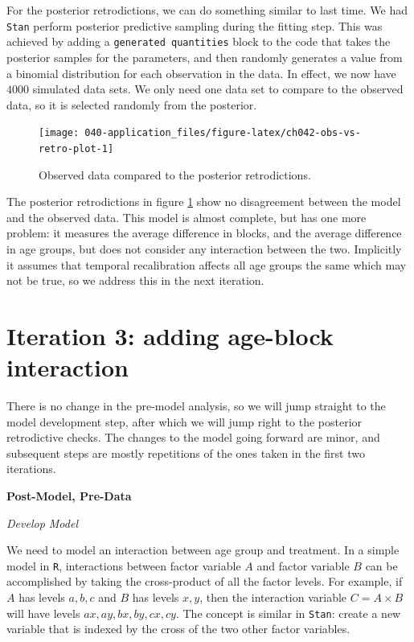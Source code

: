 \documentclass[11pt, oneside, openany]{scrbook}
\begin{document}
For the posterior retrodictions, we can do something similar to last time. We had \texttt{Stan} perform posterior predictive sampling during the fitting step. This was achieved by adding a \texttt{generated\ quantities} block to the code that takes the posterior samples for the parameters, and then randomly generates a value from a binomial distribution for each observation in the data. In effect, we now have \(4000\) simulated data sets. We only need one data set to compare to the observed data, so it is selected randomly from the posterior.

\begin{figure}

{\centering \texttt{[image: 040-application\_files/figure-latex/ch042-obs-vs-retro-plot-1]} 

}

\caption{Observed data compared to the posterior retrodictions.}\label{fig:ch042-obs-vs-retro-plot}
\end{figure}

The posterior retrodictions in figure \ref{fig:ch042-obs-vs-retro-plot} show no disagreement between the model and the observed data. This model is almost complete, but has one more problem: it measures the average difference in blocks, and the average difference in age groups, but does not consider any interaction between the two. Implicitly it assumes that temporal recalibration affects all age groups the same which may not be true, so we address this in the next iteration.

\hypertarget{iter3}{%
\section{Iteration 3: adding age-block interaction}\label{iter3}}

There is no change in the pre-model analysis, so we will jump straight to the model development step, after which we will jump right to the posterior retrodictive checks. The changes to the model going forward are minor, and subsequent steps are mostly repetitions of the ones taken in the first two iterations.

\textbf{Post-Model, Pre-Data}

\emph{Develop Model}

We need to model an interaction between age group and treatment. In a simple model in \texttt{R}, interactions between factor variable \(A\) and factor variable \(B\) can be accomplished by taking the cross-product of all the factor levels. For example, if \(A\) has levels \(a, b, c\) and \(B\) has levels \(x, y\), then the interaction variable \(C=A\times B\) will have levels \(ax, ay, bx, by, cx, cy\). The concept is similar in \texttt{Stan}: create a new variable that is indexed by the cross of the two other factor variables.
\end{document}
